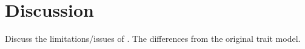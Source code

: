 
\section{Discussion}
\label{sec:discuss}

Discuss the limitations/issues of \name. The differences from the original trait model.
